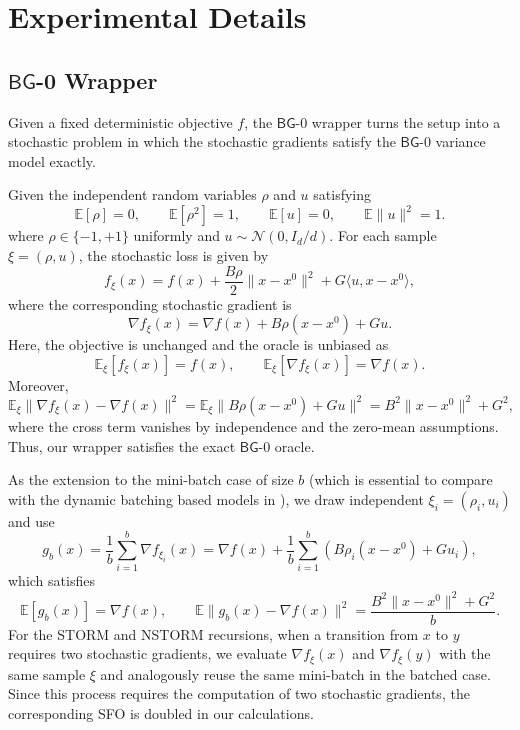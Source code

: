 \documentclass[letter,11pt]{article}
\newcommand{\E}{\mathbb{E}}
\begin{document}
\newpage
\section{Experimental Details}

\subsection{\texorpdfstring{$\mathsf{BG}$-0}{BG-0} Wrapper}\label{app:exp_bg0_oracle}
Given a fixed deterministic objective $f$, the $\mathsf{BG}$-0 wrapper turns the setup into a stochastic problem in which the stochastic gradients satisfy the $\mathsf{BG}$-0 variance model exactly.

Given the independent random variables $\rho$ and $u$ satisfying
\[
\E[\rho]=0,\qquad \E[\rho^2]=1,\qquad
\E[u]=0,\qquad \E\|u\|^2=1.
\]
where  $\rho\in\{-1,+1\}$ uniformly and
$u\sim\mathcal N(0,I_d/d)$. For each sample
$\xi=(\rho,u)$, the stochastic loss is given by
\[
f_\xi(x)
=
f(x)
+
\frac{B\rho}{2}\|x-x^0\|^2
+
G\langle u,x-x^0\rangle,
\]
where the corresponding stochastic gradient is
\[
\nabla f_\xi(x)
=
\nabla f(x)+B\rho(x-x^0)+Gu .
\]
Here, the objective is unchanged and the oracle is unbiased as
\[
\E_\xi[f_\xi(x)]=f(x),
\qquad
\E_\xi[\nabla f_\xi(x)]=\nabla f(x).
\]
Moreover,
\[
\E_\xi\|\nabla f_\xi(x)-\nabla f(x)\|^2
=
\E_\xi\|B\rho(x-x^0)+Gu\|^2
=
B^2\|x-x^0\|^2+G^2,
\]
where the cross term vanishes by independence and the zero-mean assumptions. Thus, our wrapper satisfies the exact \(\mathsf{BG}\)-0 oracle.

As the extension to the mini-batch case of size $b$ (which is essential to compare with the dynamic batching based models in \cite{fazla2026lower}), we draw independent
\(\xi_i=(\rho_i,u_i)\) and use
\[
g_b(x)
=
\frac1b\sum_{i=1}^b \nabla f_{\xi_i}(x)
=
\nabla f(x)
+
\frac1b\sum_{i=1}^b
\left(B\rho_i(x-x^0)+Gu_i\right),
\]
which satisfies
\[
\E[g_b(x)]=\nabla f(x),
\qquad
\E\|g_b(x)-\nabla f(x)\|^2
=
\frac{B^2\|x-x^0\|^2+G^2}{b}.
\]
For the STORM and NSTORM recursions, when a transition from \(x\) to \(y\) requires two stochastic gradients, we evaluate \(\nabla f_\xi(x)\) and \(\nabla f_\xi(y)\) with the same sample \(\xi\) and analogously reuse the same mini-batch in the batched case. Since this process requires the computation of two stochastic gradients, the corresponding SFO is doubled in our calculations.
\end{document}
